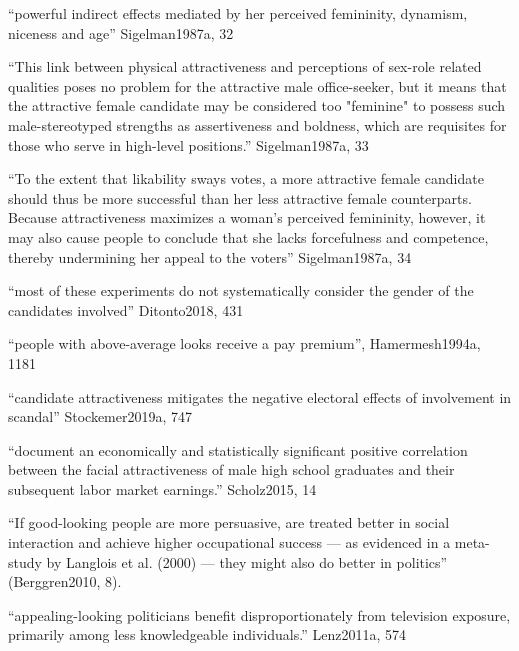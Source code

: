 
``powerful indirect effects mediated by her perceived femininity, dynamism, niceness and age'' Sigelman1987a, 32

``This link between physical attractiveness and perceptions of sex-role related qualities poses no problem for the attractive male office-seeker, but it means that the attractive female candidate may be considered too "feminine" to possess such male-stereotyped strengths as assertiveness and boldness, which are requisites for those who serve in high-level positions.''  Sigelman1987a, 33

``To the extent that likability sways votes, a more attractive female candidate should thus be more successful than her less attractive female counterparts. Because attractiveness maximizes a woman's perceived femininity, however, it may also cause people to conclude that she lacks forcefulness and competence, thereby undermining her appeal to the voters''  Sigelman1987a, 34

``most of these experiments do not systematically consider the gender of the candidates involved'' Ditonto2018, 431




		``people with above-average looks receive a pay premium'', Hamermesh1994a, 1181

		``candidate attractiveness mitigates the negative electoral effects of involvement in scandal'' Stockemer2019a, 747

``document an economically and statistically significant positive correlation between the facial attractiveness of male high school graduates and their subsequent labor market earnings.'' Scholz2015, 14

``If good-looking people are more persuasive, are treated better in social interaction and achieve higher occupational success — as evidenced in a meta-study by Langlois et al. (2000) — they might also do better in politics'' (Berggren2010, 8).



``appealing-looking politicians benefit disproportionately from television exposure, primarily among less knowledgeable individuals.'' Lenz2011a, 574

